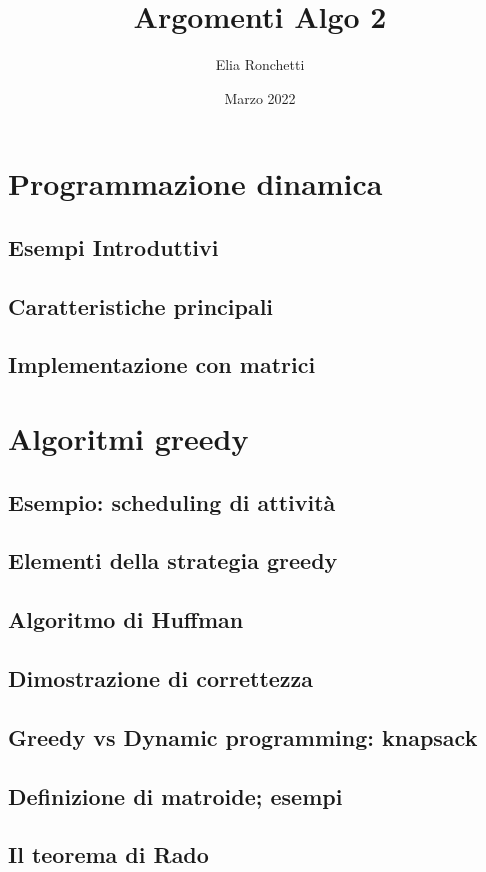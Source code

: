 \documentclass[12pt, a4paper, openany]{book}
\begin{document}
\title{Argomenti Algo 2}
\author{Elia Ronchetti}
\date{Marzo 2022}

\maketitle
\tableofcontents

\chapter{Programmazione dinamica}
\section{Esempi Introduttivi}
\section{Caratteristiche principali}
\section{Implementazione con matrici}

\chapter{Algoritmi greedy}
\section{Esempio: scheduling di attività}
\section{Elementi della strategia greedy}
\section{Algoritmo di Huffman}
\section{Dimostrazione di correttezza}
\section{Greedy vs Dynamic programming: knapsack}
\section{Definizione di matroide; esempi}
\section{Il teorema di Rado}
\end{document}
